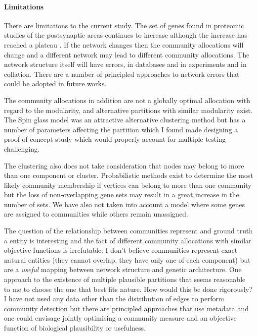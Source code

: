 \paragraph{Limitations}
\label{sec:discussion window}
There are limitations to the current study. The set of genes found in proteomic studies of the  postsynaptic areas continues to increase although the increase has reached a plateau\cite{heil2018systems} . If the network changes then the community allocations will change and a different network may lead to different community allocations. The network structure itself will have errors, in databases and in experiments and in collation. There are a number of principled approaches to network errors that could be adopted in future works\cite{newman2018networks}. 

The community allocations in addition are not a globally optimal allocation with regard to the modularity, and alternative partitions with similar modularity exist. The Spin glass model was an attractive alternative clustering method but has a number of parameters affecting the partition which I found made designing a proof of concept study which would properly account for multiple testing challenging.

The clustering also does not take consideration that nodes may belong to more than one component or cluster. Probabilistic methods exist to determine the most likely community membership\cite{yang2013overlapping} if vertices can belong to more than one community but the loss of non-overlapping gene sets may result in a great increase in the number of sets. We have also not taken into account a model where some genes are assigned to communities while others remain unassigned.

The question of the relationship between communities represent and ground truth a entity is interesting \cite{peel2017ground} and the fact of different community allocations with similar objective functions is irrefutable. I don't believe communities represent exact natural entities (they cannot overlap, they have only one of each component) but are a \textit{useful} mapping between network structure and genetic architecture. One approach to the existence of multiple plausible partitions that seems reasonable to me to choose the one that best fits nature. How would this be done rigorously? I have not used any data other than the distribution of edges to perform community detection but there are principled approaches\cite{newman2016structure}\cite{meng2018coupled} that use metadata and one could envisage jointly optimising a community measure and an objective function of biological plausibility or usefulness.   


